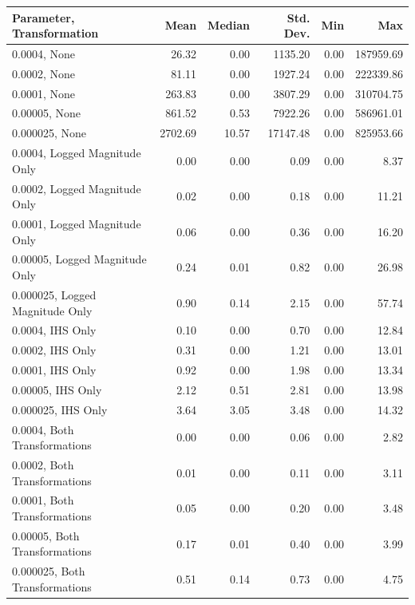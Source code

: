 \begin{table}[ht]
\centering
\begin{tabular}{lrrrrr}
  \toprule
Parameter, Transformation & Mean & Median & Std. Dev. & Min & Max \\ 
  \midrule
0.0004, None & 26.32 & 0.00 & 1135.20 & 0.00 & 187959.69 \\ 
  0.0002, None & 81.11 & 0.00 & 1927.24 & 0.00 & 222339.86 \\ 
  0.0001, None & 263.83 & 0.00 & 3807.29 & 0.00 & 310704.75 \\ 
  0.00005, None & 861.52 & 0.53 & 7922.26 & 0.00 & 586961.01 \\ 
  0.000025, None & 2702.69 & 10.57 & 17147.48 & 0.00 & 825953.66 \\ 
  0.0004, Logged Magnitude Only & 0.00 & 0.00 & 0.09 & 0.00 & 8.37 \\ 
  0.0002, Logged Magnitude Only & 0.02 & 0.00 & 0.18 & 0.00 & 11.21 \\ 
  0.0001, Logged Magnitude Only & 0.06 & 0.00 & 0.36 & 0.00 & 16.20 \\ 
  0.00005, Logged Magnitude Only & 0.24 & 0.01 & 0.82 & 0.00 & 26.98 \\ 
  0.000025, Logged Magnitude Only & 0.90 & 0.14 & 2.15 & 0.00 & 57.74 \\ 
  0.0004, IHS Only & 0.10 & 0.00 & 0.70 & 0.00 & 12.84 \\ 
  0.0002, IHS Only & 0.31 & 0.00 & 1.21 & 0.00 & 13.01 \\ 
  0.0001, IHS Only & 0.92 & 0.00 & 1.98 & 0.00 & 13.34 \\ 
  0.00005, IHS Only & 2.12 & 0.51 & 2.81 & 0.00 & 13.98 \\ 
  0.000025, IHS Only & 3.64 & 3.05 & 3.48 & 0.00 & 14.32 \\ 
  0.0004, Both Transformations & 0.00 & 0.00 & 0.06 & 0.00 & 2.82 \\ 
  0.0002, Both Transformations & 0.01 & 0.00 & 0.11 & 0.00 & 3.11 \\ 
  0.0001, Both Transformations & 0.05 & 0.00 & 0.20 & 0.00 & 3.48 \\ 
  0.00005, Both Transformations & 0.17 & 0.01 & 0.40 & 0.00 & 3.99 \\ 
  0.000025, Both Transformations & 0.51 & 0.14 & 0.73 & 0.00 & 4.75 \\ 
   \bottomrule
\end{tabular}
\end{table}
